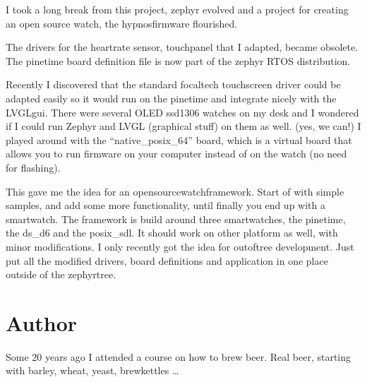 \documentclass[letterpaper,10pt,english]{sphinxmanual}
\begin{document}
I took a long break from this project, zephyr evolved and a project for creating an open source watch, the hypnos\sphinxhyphen{}firmware flourished.

The drivers for the heartrate sensor, touchpanel that I adapted, became obsolete.
The pinetime board definition file is now part of the zephyr RTOS distribution.

Recently I discovered that the standard focaltech touchscreen driver could be adapted easily so it would run on the pinetime and integrate nicely with the LVGL\sphinxhyphen{}gui. There were several OLED ssd1306 watches on my desk and I wondered if I could run Zephyr and LVGL (graphical stuff) on them as well. (yes, we can!)
I played around with the “native\_posix\_64” board, which is a virtual board that allows you to run firmware on your computer instead of on the watch (no need for flashing).

This gave me the idea for an opensource\sphinxhyphen{}watch\sphinxhyphen{}framework.
Start of with simple samples, and add some more functionality, until finally you end up with a smartwatch.
The framework is build around three smartwatches, the pinetime, the ds\_d6 and the posix\_sdl.
It should work on other platform as well, with minor modifications.
I only recently got the idea for out\sphinxhyphen{}of\sphinxhyphen{}tree development.
Just put all the modified drivers, board definitions and application in one place outside of the zephyr\sphinxhyphen{}tree.

\begin{sphinxVerbatim}[commandchars=\\\{\}]
        
           
\end{sphinxVerbatim}


\chapter{Author}
\label{\detokenize{author:author}}\label{\detokenize{author::doc}}
Some 20 years ago I attended a course on how to brew beer.
Real beer, starting with barley, wheat, yeast, brewkettles …
\end{document}
